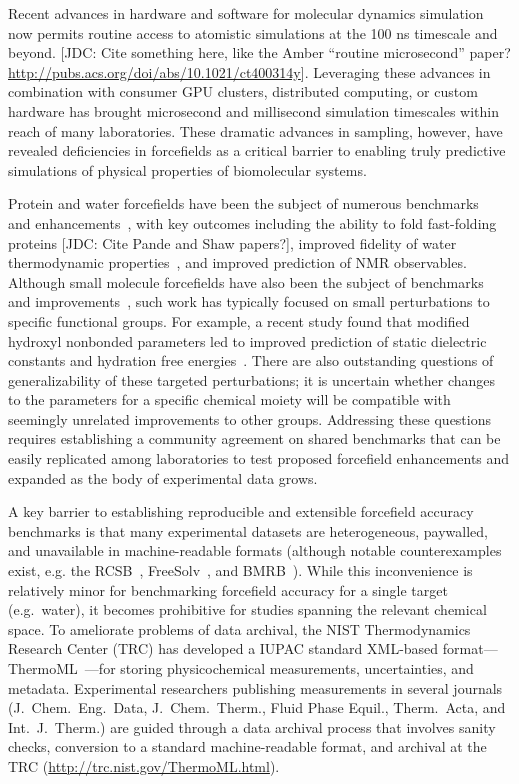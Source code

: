 \documentclass[aps,pre,twocolumn,nofootinbib,superscriptaddress,linenumbers]{revtex4-1}
\begin{document}
Recent advances in hardware and software for molecular dynamics simulation now permits routine access to atomistic simulations at the 100 ns timescale and beyond.
 {\color{red}[JDC: Cite something here, like the Amber ``routine microsecond'' paper? \url{http://pubs.acs.org/doi/abs/10.1021/ct400314y}]}. 
Leveraging these advances in combination with consumer GPU clusters, distributed computing, or custom hardware has brought microsecond and millisecond simulation timescales within reach of many laboratories.  
These dramatic advances in sampling, however, have revealed deficiencies in forcefields as a critical barrier to enabling truly predictive simulations of physical properties of biomolecular systems.  

Protein and water forcefields have been the subject of numerous benchmarks~\cite{lindorff2012systematic} and enhancements~\cite{li2011iterative, best2012optimization, Lindorff-Larsen2010}, with key outcomes including the ability to fold fast-folding proteins {\color{red}[JDC: Cite Pande and Shaw papers?]}, improved fidelity of water thermodynamic properties~\cite{horn2004}, and improved prediction of NMR observables.  
Although small molecule forcefields have also been the subject of benchmarks~\cite{caleman2011force} and improvements~\cite{fennell2014fixed}, such work has typically focused on small perturbations to specific functional groups.  
For example, a recent study found that modified hydroxyl nonbonded parameters led to improved prediction of static dielectric constants and hydration free energies~\cite{fennell2014fixed}.
There are also outstanding questions of generalizability of these targeted perturbations; it is uncertain whether changes to the parameters for a specific chemical moiety will be compatible with seemingly unrelated improvements to other groups.
Addressing these questions requires establishing a community agreement on shared benchmarks that can be easily replicated among laboratories to test proposed forcefield enhancements and expanded as the body of experimental data grows.

A key barrier to establishing reproducible and extensible forcefield accuracy benchmarks is that many experimental datasets are heterogeneous, paywalled, and unavailable in machine-readable formats (although notable counterexamples exist, e.g. the RCSB~\cite{Berman2000}, FreeSolv~\cite{freesolv}, and BMRB~\cite{Ulrich2008}).  
While this inconvenience is relatively minor for benchmarking forcefield accuracy for a single target (e.g.~water), it becomes prohibitive for studies spanning the relevant chemical space.  
To ameliorate problems of data archival, the NIST Thermodynamics Research Center (TRC) has developed a IUPAC standard XML-based format---ThermoML~\cite{frenkel2006xml}---for storing physicochemical measurements, uncertainties, and metadata.
Experimental researchers publishing measurements in several journals (J.~Chem.~Eng.~Data, J.~Chem.~Therm., Fluid Phase Equil., Therm.~Acta, and Int.~J.~Therm.) are guided through a data archival process that involves sanity checks, conversion to a standard machine-readable format, and archival at the TRC (\url{http://trc.nist.gov/ThermoML.html}).  
\end{document}

